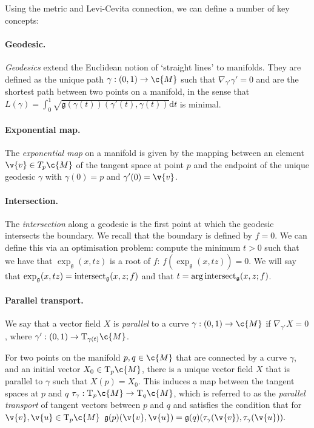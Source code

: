 Using the metric and Levi-Cevita connection, we can define a number of key concepts: \paragraph{Geodesic.
} \emph{Geodesics} extend the Euclidean notion of `straight lines' to manifolds.
They are defined as the unique path \(\gamma: (0,1) \to \c{M}\) such that $\nabla_{\gamma'}\gamma' = 0$ and are the shortest path between two points on a manifold, in the sense that \(\textstyle{L(\gamma) = \int_0^1 \sqrt{\mathfrak{g}(\gamma(t))(\gamma'(t), \gamma(t))} } \mathrm{d}t \) is minimal.

\paragraph{Exponential map.}
The \emph{exponential map} on a manifold is given by the mapping between an element \(\v{v}\in T_p\c{M}\) of the tangent space at point \(p\) and the endpoint of the unique geodesic \(\gamma\) with \(\gamma(0) = p\) and \(\gamma'(0) = \v{v}\).

\paragraph{Intersection.}
The \emph{intersection} along a geodesic is the first point at which the geodesic intersects the boundary.
We recall that the boundary is defined by $f=0$.
We can define this via an optimisation problem: compute the minimum $t > 0$ such that we have that $\exp_\mathfrak{g}(x, t z)$ is a root of $f$: $f(\exp_\mathfrak{g}(x, t z)) = 0$.
We will say that $\exp_\mathfrak{g}(x, t z) = \operatorname{intersect}_\mathfrak{g} (x, z; f) $ and that $t = \arg\operatorname{intersect}_\mathfrak{g} (x, z; f)$.

\paragraph{Parallel transport.}
We say that a vector field \(X\) is \emph{parallel} to a curve \(\gamma: (0,1)\to\c{M}\) if \(\nabla_{\gamma'} X = 0\), where \(\gamma': (0,1)\to \mathrm{T}_{\gamma(t)}\c{M}\).

For two points on the manifold \(p,q\in\c{M}\) that are connected by a curve \(\gamma\), and an initial vector \(X_0 \in \mathrm{T}_p\c{M}\), there is a unique vector field \(X\) that is parallel to \(\gamma\) such that \(X(p) = X_0\).
This induces a map between the tangent spaces at \(p\) and \(q\) \(\tau_\gamma: \mathrm{T}_p\c{M} \to \mathrm{T}_q\c{M}\), which is referred to as the \emph{parallel transport} of tangent vectors between \(p\) and \(q\) and satisfies the condition that for \(\v{v}, \v{u} \in \mathrm{T}_p\c{M}\) \(\mathfrak{g}(p)(\v{v}, \v{u}) = \mathfrak{g}(q)(\tau_\gamma(\v{v}), \tau_\gamma(\v{u})).
\)

